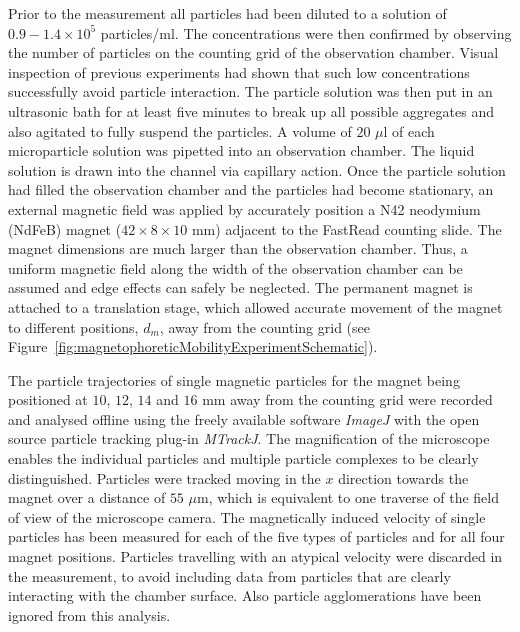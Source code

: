 Prior to the measurement all particles had been diluted to a solution of $0.9-1.4\times 10^{5}$ particles/ml. The concentrations were then confirmed by observing the number of particles on the counting grid of the observation chamber. Visual inspection of previous experiments had shown that such low concentrations successfully avoid particle interaction. The particle solution was then put in an ultrasonic bath for at least five minutes to break up all possible aggregates and also agitated to fully suspend the particles. A volume of $20$ $\mu$l of each microparticle solution was pipetted into an observation chamber. The liquid solution is drawn into the channel via capillary action. Once the particle solution had filled the observation chamber and the particles had become stationary, an external magnetic field was applied by accurately position a N42 neodymium (NdFeB) magnet ($42\times8\times10$ mm) adjacent to the FastRead counting slide. The magnet dimensions are much larger than the observation chamber. Thus, a uniform magnetic field along the width of the observation chamber can be assumed and edge effects can safely be neglected. The permanent magnet is attached to a translation stage, which allowed accurate movement of the magnet to different positions, $d_{m}$, away from the counting grid (see Figure~\ref{fig:magnetophoreticMobilityExperimentSchematic}).

The particle trajectories of single magnetic particles for the magnet being positioned at $10$, $12$, $14$ and $16$ mm away from the counting grid were recorded and analysed offline using the freely available software \textit{ImageJ} with the open source particle tracking plug-in \textit{MTrackJ}. The magnification of the microscope enables the individual particles and multiple particle complexes to be clearly distinguished. Particles were tracked moving in the $x$ direction towards the magnet over a distance of $55$ $\mu$m, which is equivalent to one traverse of the field of view of the microscope camera. The magnetically induced velocity of single particles has been measured for each of the five types of particles and for all four magnet positions. Particles travelling with an atypical velocity were discarded in the measurement, to avoid including data from particles that are clearly interacting with the chamber surface. Also particle agglomerations have been ignored from this analysis. 

